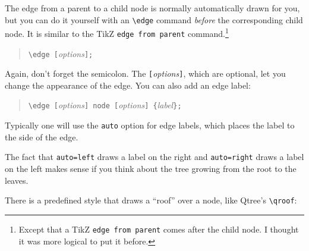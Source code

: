 \documentclass{article}
\begin{document}
The edge from a parent to a child node is normally automatically drawn
for you, but you can do it yourself with an \verb|\edge| command
\emph{before}\/ the corresponding child node. It is similar to the
TikZ \verb|edge from parent| command.\footnote{Except that a TikZ
\texttt{edge from parent} comes after the child node. I thought it was
more logical to put it before.}
\begin{quote}
\verb|\edge [|\textit{options}\verb|];|
\end{quote}
Again, don't forget the semicolon. The
\verb|[|\textit{options}\verb|]|, which are optional, let you change
the appearance of the edge. You can also add an edge label:
\begin{quote}
\verb|\edge [|\textit{options}\verb|] node [|\textit{options}\verb|] {|\textit{label}\verb|};|
\end{quote}
Typically one will use the \verb|auto| option for edge labels, which
places the label to the side of the edge.
\begin{center}
\begin{SideBySideExample}[xrightmargin=1.25in]
\newcommand{\initial}[1]{\ensuremath{\alpha_{\textrm{\scriptsize #1}}}}
\newcommand{\auxiliary}[1]{\ensuremath{\beta_{\textrm{\scriptsize #1}}}}

\end{SideBySideExample}
\end{center}
The fact that \verb|auto=left| draws a label on the right and
\verb|auto=right| draws a label on the left makes sense if you think
about the tree growing from the root to the leaves.

There is a predefined style that draws a ``roof'' over a node, like Qtree's \verb|\qroof|:
\begin{center}
\begin{Example}
\end{Example}
\end{center}
\end{document}
